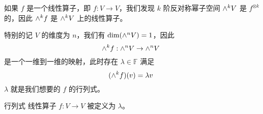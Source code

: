 
如果 $f$ 是一个线性算子，即 $f: V \to V$，我们发现 $k$ 阶反对称幂子空间 ${\large \wedge}^k V$ 是 $f^{\otimes k}$ 的，因此 ${\large \wedge}^k f$ 是 ${\large \wedge}^k V$ 上的线性算子。

特别的记 $V$ 的维度为 $n$，我们有 $\dim({\large \wedge}^n V) = 1$，因此
\begin{equation}
{\large \wedge}^k f: {\large \wedge}^n V \to {\large \wedge}^n V~
\end{equation}
是一个一维到一维的映射，此时存在 $\lambda \in \mathbb{F}$ 满足
\begin{equation}
({\large \wedge}^k f)(v) = \lambda v~
\end{equation}
$\lambda$ 就是我们想要的 $f$ 的行列式。

\begin{definition}{行列式}
线性算子 $f: V \to V$ 被定义为 $\lambda$。
\end{definition}


